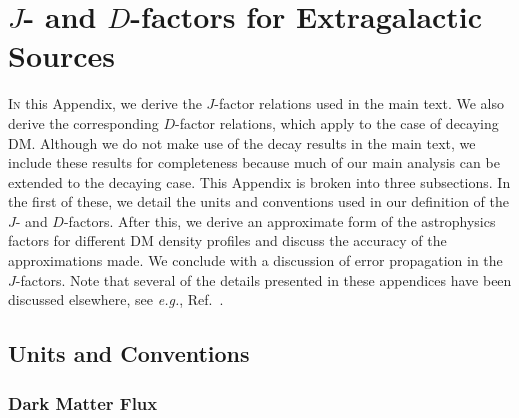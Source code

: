 
\chapter{$J$- and $D$-factors for Extragalactic Sources}
\label{app:JDrelations}

\lettrine[lines=3]{I}{n} this Appendix, we derive the $J$-factor relations used in the main text. We also derive the corresponding $D$-factor relations, which apply to the case of decaying DM.  Although we do not make use of the decay results in the main text, we include these results for completeness because much of our main analysis can be extended to the decaying case.
This Appendix is broken into three subsections. In the first of these, we detail the units and conventions used in our definition of the $J$- and $D$-factors.  After this, we derive an approximate form of the astrophysics factors for different DM density profiles and discuss the accuracy of the approximations made.  We conclude with a discussion of error propagation in the $J$-factors.  Note that several of the details presented in these appendices have been discussed elsewhere, see \emph{e.g.}, Ref.~\cite{Abdo:2010ex,Charbonnier:2011ft,Charbonnier:2012gf,Evans:2016xwx}. 

\section{Units and Conventions}

\subsection{Dark Matter Flux}

